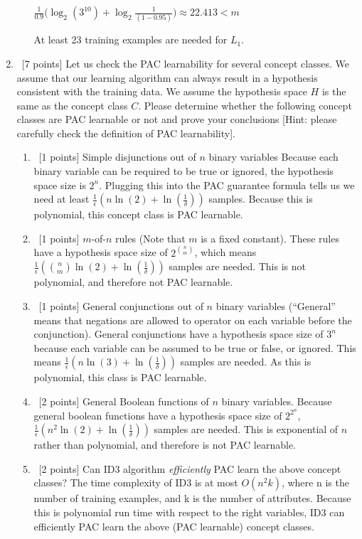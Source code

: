 \documentclass[12pt, fullpage,letterpaper]{article}
\begin{document}
\begin{enumerate}
\begin{enumerate}
	$\frac{1}{0.9}\big(\log_2(3^{10}) + \log_2\frac{1}{(1-0.95)}\big) \approx 22.413 < m$
	
	At least 23 training examples are needed for $L_1$.
	\bigskip
\end{enumerate}

\item~[7 points] Let us check the PAC learnability for several concept classes. We assume that our learning algorithm can always result in a hypothesis consistent with the training data. We assume the hypothesis space $H$ is the same as the concept class $C$. Please determine whether the following concept classes are PAC learnable or not and prove your conclusions [Hint: please carefully check the definition of PAC learnability]. 
\begin{enumerate}
	\item~[1 points] Simple disjunctions out of $n$ binary variables
	\bigskip\newline
	Because each binary variable can be required to be true or ignored, the hypothesis space size is $2^n$. Plugging this into the PAC guarantee formula tells us we need at least $\frac{1}{\epsilon}(n\ln(2) + \ln(\frac{1}{\delta}))$ samples. Because this is polynomial, this concept class is PAC learnable.
	\bigskip
	\item~[1 points] $m$-of-$n$ rules (Note that $m$ is a fixed constant).
	\bigskip\newline
	These rules have a hypothesis space size of $2^{\binom{n}{m}}$, which means $\frac{1}{\epsilon}(\binom{n}{m}\ln(2) + \ln(\frac{1}{\delta}))$ samples are needed. This is not polynomial, and therefore not PAC learnable.
	\bigskip
	\item~[1 points] General conjunctions out of $n$ binary variables (``General'' means that negations are allowed to operator on each variable before the conjunction).
	\bigskip\newline
	General conjunctions have a hypothesis space size of $3^n$ because each variable can be assumed to be true or false, or ignored. This means $\frac{1}{\epsilon}(n\ln(3) + \ln(\frac{1}{\delta}))$ samples are needed. As this is polynomial, this class is PAC learnable. 
	\bigskip
	\item~[2 points] General Boolean functions of $n$ binary variables. 
	\bigskip\newline
	Because general boolean functions have a hypothesis space size of $2^{2^n}$, $\frac{1}{\epsilon}(n^2\ln(2) + \ln(\frac{1}{\delta}))$ samples are needed. This is exponential of $n$ rather than polynomial, and therefore is not PAC learnable.
	\bigskip
	\item~[2 points] Can ID3 algorithm \textit{efficiently} PAC learn the above concept classes?
	\bigskip
	The time complexity of ID3 is at most $O(n^2k)$, where n is the number of training examples, and k is the number of attributes. Because this is polynomial run time with respect to the right variables, ID3 can efficiently PAC learn the above (PAC learnable) concept classes.
\end{enumerate}


\end{enumerate}
\end{document}
